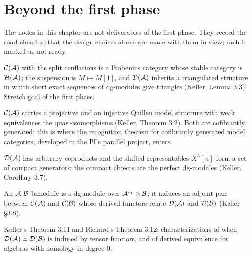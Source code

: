 \chapter{Beyond the first phase}
\label{ch:beyond}

The nodes in this chapter are not deliverables of the first phase. They record the road
ahead so that the design choices above are made with them in view; each is marked as not
ready.

\begin{theorem}
\label{thm:derived-triangulated}
\notready
{}
$\mathcal{C}(\mathcal{A})$ with the split conflations is a Frobenius category whose stable category is
$\mathcal{H}(\mathcal{A})$; the suspension is $M \mapsto M[1]$, and $\mathcal{D}(\mathcal{A})$ inherits a triangulated
structure in which short exact sequences of dg-modules give triangles (Keller, Lemma 3.3).
Stretch goal of the first phase.
\end{theorem}

\begin{theorem}
\label{thm:model-structures}
\notready
{}
$\mathcal{C}(\mathcal{A})$ carries a projective and an injective Quillen model structure with weak
equivalences the quasi-isomorphisms (Keller, Theorem 3.2). Both are cofibrantly generated;
this is where the recognition theorem for cofibrantly generated model categories, developed
in the PI's parallel project, enters.
\end{theorem}

\begin{theorem}
\label{thm:compact-generators}
\notready
{}
$\mathcal{D}(\mathcal{A})$ has arbitrary coproducts and the shifted representables $X^{\wedge}[n]$ form a
set of compact generators; the compact objects are the perfect dg-modules
(Keller, Corollary 3.7).
\end{theorem}

\begin{definition}
\label{def:bimodules}
\notready
{}
An $\mathcal{A}$-$\mathcal{B}$-bimodule is a dg-module over $\mathcal{A}^{\mathrm{op}} \otimes \mathcal{B}$; it induces an adjoint
pair between $\mathcal{C}(\mathcal{A})$ and $\mathcal{C}(\mathcal{B})$ whose derived functors relate $\mathcal{D}(\mathcal{A})$ and
$\mathcal{D}(\mathcal{B})$ (Keller \S 3.8).
\end{definition}

\begin{theorem}
\label{thm:dg-morita}
\notready
{}
Keller's Theorem 3.11 and Rickard's Theorem 3.12: characterizations of when
$\mathcal{D}(\mathcal{A}) \simeq \mathcal{D}(\mathcal{B})$ is induced by tensor functors, and of derived equivalence
for algebras with homology in degree $0$.
\end{theorem}

